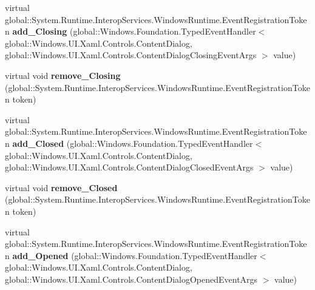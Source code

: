\begin{DoxyCompactItemize}
\item 
\mbox{\label{class_windows_1_1_u_i_1_1_xaml_1_1_controls_1_1_content_dialog_a112044e25750429e881c4e8edede4a3b}} 
virtual global\+::\+System.\+Runtime.\+Interop\+Services.\+Windows\+Runtime.\+Event\+Registration\+Token {\bfseries add\+\_\+\+Closing} (global\+::\+Windows.\+Foundation.\+Typed\+Event\+Handler$<$ global\+::\+Windows.\+U\+I.\+Xaml.\+Controls.\+Content\+Dialog, global\+::\+Windows.\+U\+I.\+Xaml.\+Controls.\+Content\+Dialog\+Closing\+Event\+Args $>$ value)
\item 
\mbox{\label{class_windows_1_1_u_i_1_1_xaml_1_1_controls_1_1_content_dialog_a13479534a17ee5bc6c49534a00724ca9}} 
virtual void {\bfseries remove\+\_\+\+Closing} (global\+::\+System.\+Runtime.\+Interop\+Services.\+Windows\+Runtime.\+Event\+Registration\+Token token)
\item 
\mbox{\label{class_windows_1_1_u_i_1_1_xaml_1_1_controls_1_1_content_dialog_a6211ece9675f87d6eff022d36ec839af}} 
virtual global\+::\+System.\+Runtime.\+Interop\+Services.\+Windows\+Runtime.\+Event\+Registration\+Token {\bfseries add\+\_\+\+Closed} (global\+::\+Windows.\+Foundation.\+Typed\+Event\+Handler$<$ global\+::\+Windows.\+U\+I.\+Xaml.\+Controls.\+Content\+Dialog, global\+::\+Windows.\+U\+I.\+Xaml.\+Controls.\+Content\+Dialog\+Closed\+Event\+Args $>$ value)
\item 
\mbox{\label{class_windows_1_1_u_i_1_1_xaml_1_1_controls_1_1_content_dialog_aa69d94be955777eb910008418fd76375}} 
virtual void {\bfseries remove\+\_\+\+Closed} (global\+::\+System.\+Runtime.\+Interop\+Services.\+Windows\+Runtime.\+Event\+Registration\+Token token)
\item 
\mbox{\label{class_windows_1_1_u_i_1_1_xaml_1_1_controls_1_1_content_dialog_a140644918023f750ab438dadf16adbc6}} 
virtual global\+::\+System.\+Runtime.\+Interop\+Services.\+Windows\+Runtime.\+Event\+Registration\+Token {\bfseries add\+\_\+\+Opened} (global\+::\+Windows.\+Foundation.\+Typed\+Event\+Handler$<$ global\+::\+Windows.\+U\+I.\+Xaml.\+Controls.\+Content\+Dialog, global\+::\+Windows.\+U\+I.\+Xaml.\+Controls.\+Content\+Dialog\+Opened\+Event\+Args $>$ value)

\end{DoxyCompactItemize}
